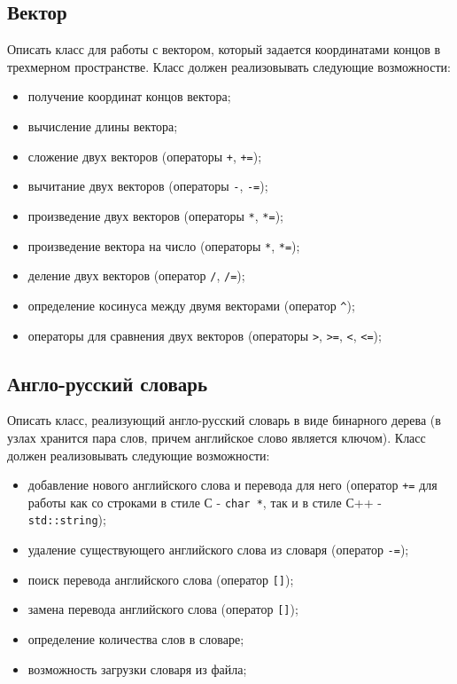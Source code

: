 \documentclass[a4paper,12pt]{article}
\begin{document}
\subsection{Вектор}

Описать класс для работы с вектором, который задается координатами
концов в трехмерном пространстве.  Класс должен реализовывать
следующие возможности:

\begin{itemize}
\item получение координат концов вектора;
\item вычисление длины вектора;
\item сложение двух векторов (операторы \lstinline|+|,
  \lstinline|+=|);
\item вычитание двух векторов (операторы \lstinline|-|,
  \lstinline|-=|);
\item произведение двух векторов (операторы \lstinline|*|,
  \lstinline|*=|);
\item произведение вектора на число (операторы \lstinline|*|,
  \lstinline|*=|);
\item деление двух векторов (оператор \lstinline|/|, \lstinline|/=|);
\item определение косинуса между двумя векторами (оператор
  \lstinline|^|);
\item операторы для сравнения двух векторов (операторы \lstinline|>|,
  \lstinline|>=|, \lstinline|<|, \lstinline|<=|);
\end{itemize}

\subsection{Англо-русский словарь}

Описать класс, реализующий англо-русский словарь в виде бинарного
дерева (в узлах хранится пара слов, причем английское слово является
ключом). Класс должен реализовывать следующие возможности:

\begin{itemize}
\item добавление нового английского слова и перевода для него
  (оператор \lstinline|+=| для работы как со строками в стиле С -
  \lstinline|char *|, так и в стиле С++ - \lstinline|std::string|);
\item удаление существующего английского слова из словаря (оператор
  \lstinline|-=|);
\item поиск перевода английского слова (оператор \lstinline|[]|);
\item замена перевода английского слова (оператор \lstinline|[]|);
\item определение количества слов в словаре;
\item возможность загрузки словаря из файла;
\end{itemize}
\end{document}
